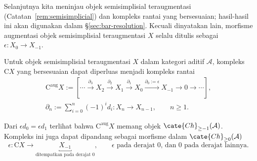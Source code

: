 Selanjutnya kita meninjau objek semisimplisial teraugmentasi
(Catatan~\ref{rem:semisimplicial}) dan kompleks rantai yang bersesuaian;
hasil-hasil ini akan digunakan dalam \S\ref{sec:bar-resolution}. Kecuali
dinyatakan lain, morfisme augmentasi objek semisimplisial teraugmentasi $X$
selalu ditulis sebagai $\epsilon:X_0\to X_{-1}$.

\begin{definition}\label{def:augmented-C-cplx}
	Untuk objek semisimplisial teraugmentasi $X$ dalam kategori aditif
	$\mathcal{A}$, kompleks $\mathrm{C}X$ yang bersesuaian dapat diperluas
	menjadi kompleks rantai
	\begin{equation*}
		\begin{gathered}
			\mathrm{C}^{\mathrm{aug}}X:=
			\left[\cdots\xrightarrow{\partial_3}X_2
			\xrightarrow{\partial_2}X_1
			\xrightarrow{\partial_1}X_0
			\xrightarrow{\partial_0:=\epsilon}X_{-1}
			\to0\to\cdots\right],\\
			\partial_n:=\sum_{i=0}^n(-1)^id_i:X_n\to X_{n-1},
			\qquad n\geq1.
		\end{gathered}
	\end{equation*}
\end{definition}

Dari $\epsilon d_0=\epsilon d_1$ terlihat bahwa
$\mathrm{C}^{\mathrm{aug}}X$ memang objek
$\cate{Ch}_{\geq-1}(\mathcal{A})$. Kompleks ini juga dapat dipandang sebagai
morfisme dalam $\cate{Ch}_{\geq0}(\mathcal{A})$
\[
\epsilon:\mathrm{C}X\to
\underbracket{X_{-1}}_{\text{ditempatkan pada derajat $0$}},
\qquad\text{$\epsilon$ pada derajat $0$, dan $0$ pada derajat lainnya}.
\]

